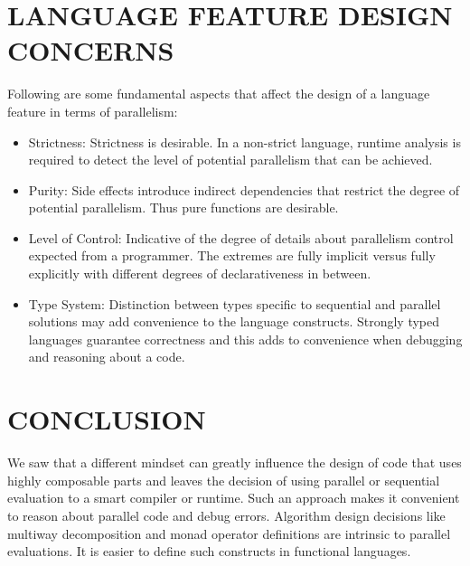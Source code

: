 \documentclass[12pt,a4paper]{article}
\begin{document}
	\section{\large LANGUAGE FEATURE DESIGN CONCERNS}
	\indent \par Following are some fundamental aspects that affect the design of a language feature in terms of parallelism:
	\begin{itemize}
	\item Strictness: Strictness is desirable. In a non-strict language, runtime analysis is required to detect the level of potential parallelism that can be achieved.
\item Purity: Side effects introduce indirect dependencies that restrict the degree of potential parallelism. Thus pure functions are desirable.
\item Level of Control: Indicative of the degree of details about parallelism control expected from a programmer. The extremes are fully implicit versus fully explicitly with different degrees of declarativeness in between.
\item Type System: Distinction between types specific to sequential and parallel solutions may add convenience to the language constructs. Strongly typed languages guarantee correctness and this adds to convenience when debugging and reasoning about a code.	
	\end{itemize}

    \section{\large CONCLUSION}
	\indent \par We saw that a different mindset can greatly influence the design of code that uses highly composable parts and leaves the decision of using parallel or sequential evaluation to a smart compiler or runtime. Such an approach makes it convenient to reason about parallel code and debug errors. Algorithm design decisions like multiway decomposition and monad operator definitions are intrinsic to parallel evaluations. It is easier to define such constructs in functional languages.
\end{document}
